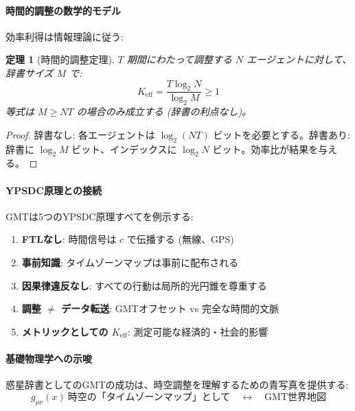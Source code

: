 \documentclass[11pt,a4paper]{article}
\newtheorem{theorem}{定理}
\begin{document}
	\paragraph{時間的調整の数学的モデル}
	効率利得は情報理論に従う:
	\begin{theorem}[時間的調整定理]
		$T$ 期間にわたって調整する $N$ エージェントに対して、辞書サイズ $M$ で:
		\begin{equation}
			K_{\mathrm{eff}} = \frac{T \log_2 N}{\log_2 M} \geq 1
		\end{equation}
		等式は $M \geq NT$ の場合のみ成立する (辞書の利点なし)。
	\end{theorem}
	
	\begin{proof}
		辞書なし: 各エージェントは $\log_2(NT)$ ビットを必要とする。辞書あり: 辞書に $\log_2 M$ ビット、インデックスに $\log_2 N$ ビット。効率比が結果を与える。
	\end{proof}
	
	\paragraph{YPSDC原理との接続}
	GMTは5つのYPSDC原理すべてを例示する:
	\begin{enumerate}
		\item \textbf{FTLなし}: 時間信号は $c$ で伝播する (無線、GPS)
		\item \textbf{事前知識}: タイムゾーンマップは事前に配布される
		\item \textbf{因果律違反なし}: すべての行動は局所的光円錐を尊重する
		\item \textbf{調整 $\neq$ データ転送}: GMTオフセット vs 完全な時間的文脈
		\item \textbf{メトリックとしての $K_{\mathrm{eff}}$}: 測定可能な経済的・社会的影響
	\end{enumerate}
	
	\paragraph{基礎物理学への示唆}
	惑星辞書としてのGMTの成功は、時空調整を理解するための青写真を提供する:
	\begin{equation}
		g_{\mu\nu}(x) \ \text{時空の「タイムゾーンマップ」として} \quad \leftrightarrow \quad \text{GMT世界地図}
	\end{equation}
	
\end{document}
